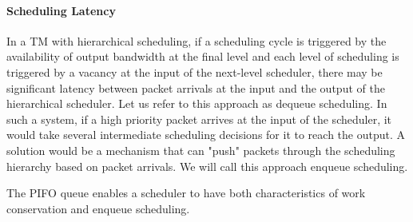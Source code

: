 \paragraph{Scheduling Latency}
In a TM with hierarchical scheduling, if a scheduling cycle is triggered by the availability of output bandwidth at the final level and each level of scheduling is triggered by a vacancy at the input of the next-level scheduler, there may be significant latency between packet arrivals at the input  and the output of the hierarchical scheduler.  Let us refer to this approach as dequeue scheduling.  In such a system, if a high priority packet arrives at the input of the scheduler, it would take several intermediate scheduling decisions for it to reach the output.  A solution would be a mechanism that can "push" packets through the scheduling hierarchy based on packet arrivals.  We will call this approach enqueue scheduling.

The PIFO queue enables a scheduler to have both characteristics of work conservation and enqueue scheduling.






